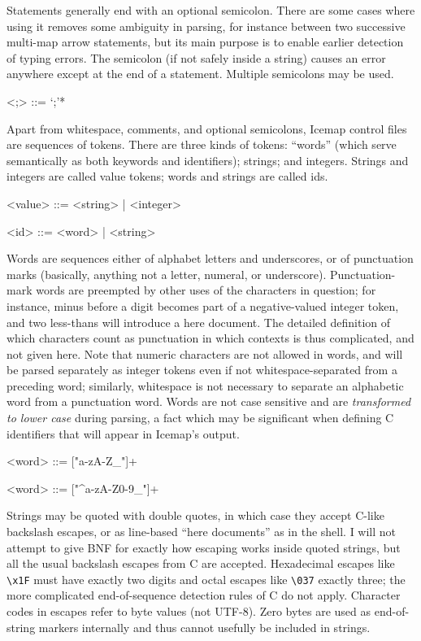 \documentclass{mitsuba}
\begin{document}
Statements generally end with an optional semicolon. 
There are some cases where using it removes some ambiguity in parsing, for
instance between two successive multi-map arrow statements, but its main
purpose is to enable earlier detection of typing errors.  The semicolon (if
not safely inside a string) causes an error anywhere except at the end of a
statement.  Multiple semicolons may be used.

\begin{grammar}
<;> ::= `;'*
\end{grammar}

Apart from whitespace, comments, and optional semicolons, Icemap control
files are sequences of tokens. There are three kinds of
tokens: ``words'' (which serve semantically as both keywords and
identifiers); strings; and integers.  Strings and integers are called
value tokens; words and strings are called ids.

\begin{grammar}
<value> ::= <string> | <integer>

<id> ::= <word> | <string>
\end{grammar}

Words are sequences either of alphabet letters and underscores,
or of punctuation marks (basically, anything not a letter, numeral, or
underscore).  Punctuation-mark words are preempted by other uses of the
characters in question; for instance, minus before a digit becomes part of a
negative-valued integer token, and two less-thans will introduce a here
document.  The detailed definition of which characters count as punctuation
in which contexts is thus complicated, and not given here.  Note that
numeric characters are not allowed in words, and will be parsed separately
as integer tokens even if not whitespace-separated from a preceding word;
similarly, whitespace is not necessary to separate an alphabetic word from a
punctuation word.  Words are not case sensitive and are \emph{transformed to
lower case} during parsing, a fact which may be significant when defining C
identifiers that will appear in Icemap's output.

\begin{grammar}
<word> ::= ["a-zA-Z_"]+

<word> ::= ["^a-zA-Z0-9_"]+
\end{grammar}

Strings may be quoted with double quotes, in which case they
accept C-like backslash escapes, or as line-based ``here documents'' as in
the shell.  I will not attempt to give BNF for exactly how escaping works
inside quoted strings, but all the usual backslash escapes from C are
accepted.  Hexadecimal escapes like \verb|\x1F| must have exactly two digits
and octal escapes like \verb|\037| exactly three; the more complicated
end-of-sequence detection rules of C do not apply.  Character codes in
escapes refer to byte values (not UTF-8).  Zero bytes are used as
end-of-string markers internally and thus cannot usefully be included in
strings.
\end{document}
